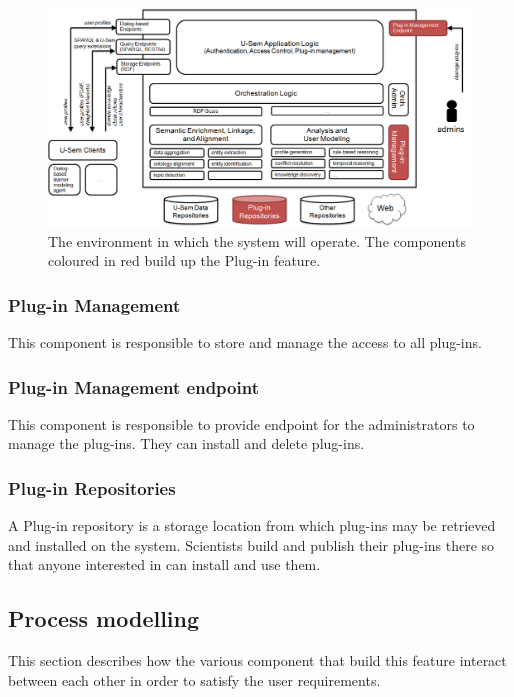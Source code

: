 \begin{figure}[h!]
  \centering
  	\includegraphics[scale=0.5]{plug-in/Environment.png}
  \caption{The environment in which the system will operate. The components coloured in red build up the Plug-in feature. }
\end{figure}

\subsubsection{Plug-in Management}

This component is responsible to store and manage the access to all plug-ins.

\subsubsection{Plug-in Management endpoint}

This component is responsible to provide endpoint for the administrators to manage the plug-ins. They can install and delete plug-ins.

\subsubsection{Plug-in Repositories}

A Plug-in repository is a storage location from which plug-ins may be retrieved and installed on the system. Scientists build and publish their plug-ins there so that anyone interested in can install and use them.


\subsection{Process modelling}

This section describes how the various component that build this feature interact between each other in order to satisfy the user requirements.

